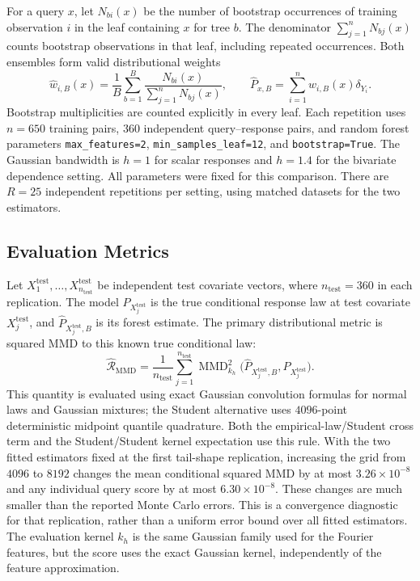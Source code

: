 \documentclass[12pt,a4paper]{article}
\newcommand{\MMD}{\operatorname{MMD}}
\newcommand{\1}{\mathbf 1}
\begin{document}
For a query $x$, let $N_{bi}(x)$ be the number of bootstrap occurrences of training observation $i$ in the leaf containing $x$ for tree $b$. The denominator $\sum_{j=1}^nN_{bj}(x)$ counts bootstrap observations in that leaf, including repeated occurrences. Both ensembles form valid distributional weights
\begin{equation}\label{eq:ffweights}
 \widehat w_{i,B}(x)=\frac1B\sum_{b=1}^B
 \frac{N_{bi}(x)}{\sum_{j=1}^nN_{bj}(x)},\qquad
 \widehat P_{x,B}=\sum_{i=1}^n\widehat w_{i,B}(x)\delta_{Y_i}.
\end{equation}
Bootstrap multiplicities are counted explicitly in every leaf. Each repetition uses $n=650$ training pairs, $360$ independent query--response pairs, and random forest parameters \texttt{max\_features=2}, \texttt{min\_samples\_leaf=12}, and \texttt{bootstrap=True}. The Gaussian bandwidth is $h=1$ for scalar responses and $h=1.4$ for the bivariate dependence setting. All parameters were fixed for this comparison. There are $R=25$ independent repetitions per setting, using matched datasets for the two estimators.

\subsection{Evaluation Metrics}
Let $X_1^{\mathrm{test}},\ldots,X_{n_{\mathrm{test}}}^{\mathrm{test}}$ be independent test covariate vectors, where $n_{\mathrm{test}}=360$ in each replication. The model $P_{X_j^{\mathrm{test}}}$ is the true conditional response law at test covariate $X_j^{\mathrm{test}}$, and $\widehat P_{X_j^{\mathrm{test}},B}$ is its forest estimate. The primary distributional metric is squared MMD to this known true conditional law:
\begin{equation}\label{eq:ffmmdrisk}
 \widehat{\mathcal R}_{\mathrm{MMD}}
 =\frac1{n_{\mathrm{test}}}\sum_{j=1}^{n_{\mathrm{test}}}
  \MMD_{k_h}^2\bigl(\widehat P_{X_j^{\mathrm{test}},B},P_{X_j^{\mathrm{test}}}\bigr).
\end{equation}
This quantity is evaluated using exact Gaussian convolution formulas for normal laws and Gaussian mixtures; the Student alternative uses $4096$-point deterministic midpoint quantile quadrature. Both the empirical-law/Student cross term and the Student/Student kernel expectation use this rule. With the two fitted estimators fixed at the first tail-shape replication, increasing the grid from $4096$ to $8192$ changes the mean conditional squared MMD by at most $3.26\times10^{-8}$ and any individual query score by at most $6.30\times10^{-8}$. These changes are much smaller than the reported Monte Carlo errors. This is a convergence diagnostic for that replication, rather than a uniform error bound over all fitted estimators. The evaluation kernel $k_h$ is the same Gaussian family used for the Fourier features, but the score uses the exact Gaussian kernel, independently of the feature approximation.
\end{document}
